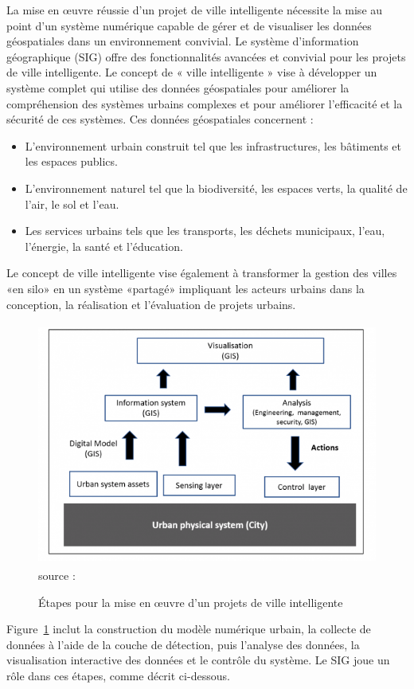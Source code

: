 \documentclass[french, a4paper, 12pt]{report}
\begin{document}
La mise en œuvre réussie d'un projet de ville intelligente nécessite la mise au point d'un système numérique capable de gérer et de visualiser les données géospatiales dans un environnement convivial. Le système d'information géographique (SIG) offre des fonctionnalités avancées et convivial pour les projets de ville intelligente.
Le concept de « ville intelligente » vise à développer un système complet qui utilise des données géospatiales pour améliorer la compréhension des systèmes urbains complexes et pour améliorer l’efficacité et la sécurité de ces systèmes. 
Ces données géospatiales concernent :
\begin{itemize}
\item \textbf{} L’environnement urbain construit tel que les infrastructures, les bâtiments et les espaces publics.
\item \textbf{} L’environnement naturel tel que la biodiversité, les espaces verts, la qualité de l’air, le sol et l’eau.
\item \textbf{} Les services urbains tels que les transports, les déchets municipaux, l’eau, l’énergie, la santé et l’éducation. 
\end{itemize} 
Le concept de ville intelligente vise également à transformer la gestion des villes «en silo» en un système «partagé» impliquant les acteurs urbains dans la conception, la réalisation et l’évaluation de projets urbains.
\begin{figure}[!ht]
    \centering
    \includegraphics[height=8cm]{images/Steps.png}
    \scriptsize{source :}
    \caption{Étapes pour la mise en œuvre d’un projets de ville intelligente}
    \label{fig:2.1}
\end{figure}
Figure~\ref{fig:2.1} inclut la construction du modèle numérique urbain, la collecte de données à l'aide de la couche de détection, puis l'analyse des données, la visualisation interactive des données et le contrôle du système. Le SIG joue un rôle dans ces étapes, comme décrit ci-dessous. 
\end{document}
